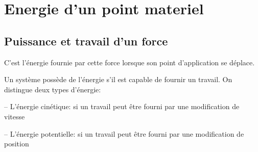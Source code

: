 \section{Energie d'un point materiel}

\subsection{Puissance et travail d'un force}

\begin{definition}
    C'est l'énergie fournie par cette force lorsque son point d'application se déplace.
\end{definition}

\begin{definition}
    Un système possède de l'énergie s'il est capable de fournir un travail.
    On distingue deux types d'énergie:

    -- L'énergie cinétique: si un travail peut être fourni par une modification de vitesse
    
    -- L'énergie potentielle: si un travail peut être fourni par une modification de position
\end{definition}